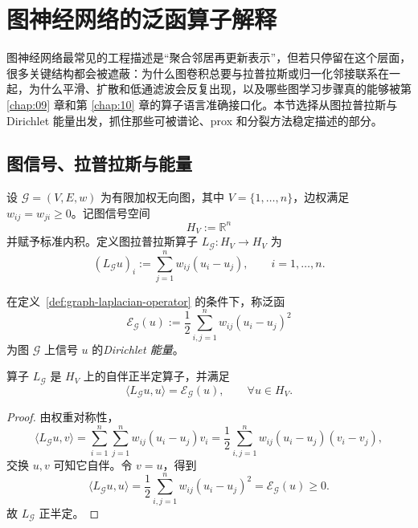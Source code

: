 \section{图神经网络的泛函算子解释}

\label{sec:12-2}

图神经网络最常见的工程描述是“聚合邻居再更新表示”，但若只停留在这个层面，很多关键结构都会被遮蔽：为什么图卷积总要与拉普拉斯或归一化邻接联系在一起，为什么平滑、扩散和低通滤波会反复出现，以及哪些图学习步骤真的能够被第 \ref{chap:09} 章和第 \ref{chap:10} 章的算子语言准确接口化。本节选择从图拉普拉斯与 Dirichlet 能量出发，抓住那些可被谱论、prox 和分裂方法稳定描述的部分。

\subsection{图信号、拉普拉斯与能量}

\begin{definition}[图拉普拉斯算子]\label{def:graph-laplacian-operator}
设 $\mathscr G=(V,E,w)$ 为有限加权无向图，其中 $V=\{1,\dots,n\}$，边权满足 $w_{ij}=w_{ji}\ge 0$。记图信号空间
\[
H_V:=\mathbb R^n
\]
并赋予标准内积。定义图拉普拉斯算子 $L_{\mathscr G}\colon H_V\to H_V$ 为
\[
(L_{\mathscr G}u)_i:=\sum_{j=1}^n w_{ij}(u_i-u_j),
\qquad i=1,\dots,n.
\]
\end{definition}

\begin{definition}[图 Dirichlet 能量]\label{def:graph-dirichlet-energy}
在定义~\ref{def:graph-laplacian-operator} 的条件下，称泛函
\[
\mathcal E_{\mathscr G}(u)
:=
\frac12\sum_{i,j=1}^n w_{ij}(u_i-u_j)^2
\]
为图 $\mathscr G$ 上信号 $u$ 的\emph{Dirichlet 能量}。
\end{definition}

\begin{proposition}[图拉普拉斯的正性]\label{prop:graph-laplacian-positive}
算子 $L_{\mathscr G}$ 是 $H_V$ 上的自伴正半定算子，并满足
\[
\langle L_{\mathscr G}u,u\rangle=\mathcal E_{\mathscr G}(u),
\qquad \forall u\in H_V.
\]
\end{proposition}

\begin{proof}
由权重对称性，
\[
\langle L_{\mathscr G}u,v\rangle
=
\sum_{i=1}^n \sum_{j=1}^n w_{ij}(u_i-u_j)v_i
=
\frac12\sum_{i,j=1}^n w_{ij}(u_i-u_j)(v_i-v_j),
\]
交换 $u,v$ 可知它自伴。令 $v=u$，得到
\[
\langle L_{\mathscr G}u,u\rangle
=
\frac12\sum_{i,j=1}^n w_{ij}(u_i-u_j)^2
=
\mathcal E_{\mathscr G}(u)\ge 0.
\]
故 $L_{\mathscr G}$ 正半定。
\end{proof}

